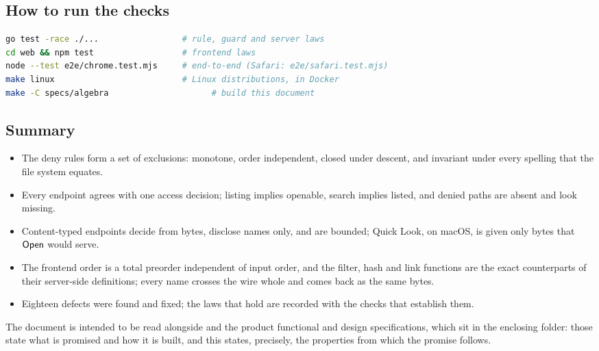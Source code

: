 \subsection{How to run the checks}

\begin{lstlisting}[language=bash]
go test -race ./...                 # rule, guard and server laws
cd web && npm test                  # frontend laws
node --test e2e/chrome.test.mjs     # end-to-end (Safari: e2e/safari.test.mjs)
make linux                          # Linux distributions, in Docker
make -C specs/algebra                     # build this document
\end{lstlisting}

\subsection{Summary}

\begin{itemize}
  \item The deny rules form a set of exclusions: monotone, order independent,
        closed under descent, and invariant under every spelling that the file
        system equates.
  \item Every endpoint agrees with one access decision; listing implies
        openable, search implies listed, and denied paths are absent and look
        missing.
  \item Content-typed endpoints decide from bytes, disclose names only, and are
        bounded; Quick Look, on macOS, is given only bytes that $\mathsf{Open}$ would serve.
  \item The frontend order is a total preorder independent of input order, and
        the filter, hash and link functions are the exact counterparts of their
        server-side definitions; every name crosses the wire whole and comes back as
        the same bytes.
  \item Eighteen defects were found and fixed; the laws that hold are recorded with
        the checks that establish them.
\end{itemize}

The document is intended to be read alongside  and the product
functional and design specifications, which sit in the enclosing  folder: those state what is promised and how it is built, and this states, precisely, the
properties from which the promise follows.
